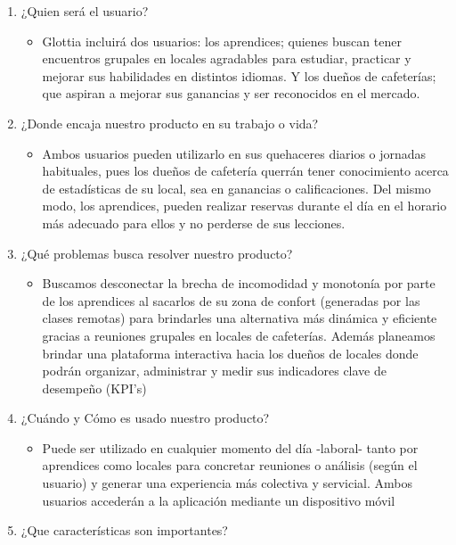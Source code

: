 \begin{enumerate}
\def\labelenumi{\arabic{enumi}.}
\tightlist
\item
  ¿Quien será el usuario?

  \begin{itemize}
  \tightlist
  \item
    Glottia incluirá dos usuarios: los aprendices; quienes buscan tener
    encuentros grupales en locales agradables para estudiar, practicar y
    mejorar sus habilidades en distintos idiomas. Y los dueños de
    cafeterías; que aspiran a mejorar sus ganancias y ser reconocidos en
    el mercado.
  \end{itemize}
\item
  ¿Donde encaja nuestro producto en su trabajo o vida?

  \begin{itemize}
  \tightlist
  \item
    Ambos usuarios pueden utilizarlo en sus quehaceres diarios o
    jornadas habituales, pues los dueños de cafetería querrán tener
    conocimiento acerca de estadísticas de su local, sea en ganancias o
    calificaciones. Del mismo modo, los aprendices, pueden realizar
    reservas durante el día en el horario más adecuado para ellos y no
    perderse de sus lecciones.
  \end{itemize}
\item
  ¿Qué problemas busca resolver nuestro producto?

  \begin{itemize}
  \tightlist
  \item
    Buscamos desconectar la brecha de incomodidad y monotonía por parte
    de los aprendices al sacarlos de su zona de confort (generadas por
    las clases remotas) para brindarles una alternativa más dinámica y
    eficiente gracias a reuniones grupales en locales de cafeterías.
    Además planeamos brindar una plataforma interactiva hacia los dueños
    de locales donde podrán organizar, administrar y medir sus
    indicadores clave de desempeño (KPI's)
  \end{itemize}
\item
  ¿Cuándo y Cómo es usado nuestro producto?

  \begin{itemize}
  \tightlist
  \item
    Puede ser utilizado en cualquier momento del día -laboral- tanto por
    aprendices como locales para concretar reuniones o análisis (según
    el usuario) y generar una experiencia más colectiva y servicial.
    Ambos usuarios accederán a la aplicación mediante un dispositivo
    móvil
  \end{itemize}
\item
  ¿Que características son importantes?


\end{enumerate}
